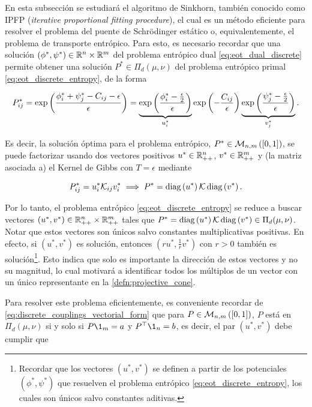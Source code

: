 En esta subsección se estudiará el algoritmo de Sinkhorn, también conocido como IPFP (\textit{iterative proportional fitting procedure}), el cual es un método eficiente para resolver el problema del puente de Schrödinger estático o, equivalentemente, el problema de transporte entrópico. Para esto, es necesario recordar que una solución $(\phi^*,\psi^*)\in\mathbb{R}^n\times\mathbb{R}^m$ del problema entrópico dual \eqref{eq:eot_dual_discrete} permite obtener una solución $P^*\in\Pi_d(\mu,\nu)$ del problema entrópico primal \eqref{eq:eot_discrete_entropy}, de la forma

\begin{equation}
	\label{eq:sinkhorn_decomposition}
	P_{ij}^* = \exp\left(\frac{\phi_i^* + \psi_j^* - C_{ij} - \epsilon}{\epsilon}\right)
	= \underbrace{\exp\left(\frac{\phi^*_i-\frac{\epsilon}{2}}{\epsilon}\right)}_{u^*_i}
	\exp\left(-\frac{C_{ij}}{\epsilon}\right)
	\underbrace{\exp\left(\frac{\psi^*_j-\frac{\epsilon}{2}}{\epsilon}\right)}_{v^*_j}.
\end{equation}

Es decir, la solución óptima para el problema entrópico, $P^*\in\mathcal{M}_{n,m}\left([0,1]\right)$, se puede factorizar usando dos vectores positivos $u^*\in\mathbb{R}^n_{++}$, $v^*\in\mathbb{R}^m_{++}$ y (la matriz asociada a) el Kernel de Gibbs con $T=\epsilon$ mediante

\begin{equation*}
	P_{ij}^* = u^*_i \mathcal{K}_{ij} v^*_i \implies P^* = \operatorname{diag}\left(u^*\right)\mathcal{K}\operatorname{diag}\left(v^*\right).
\end{equation*}

Por lo tanto, el problema entrópico \eqref{eq:eot_discrete_entropy} se reduce a buscar vectores $(u^*,v^*)\in\mathbb{R}^n_{++}\times\mathbb{R}^m_{++}$ tales que $P^* = \operatorname{diag}\left(u^*\right)\mathcal{K}\operatorname{diag}\left(v^*\right)\in\Pi_d(\mu,\nu)$. Notar que estos vectores son únicos salvo constantes multiplicativas positivas. En efecto, si $(u^*,v^*)$ es solución, entonces $(ru^*, \frac{1}{r}v^*)$ con $r>0$ también es solución\footnote{Recordar que los vectores $(u^*,v^*)$ se definen a partir de los potenciales $(\phi^*,\psi^*)$ que resuelven el problema entrópico \eqref{eq:eot_discrete_entropy}, los cuales son únicos salvo constantes aditivas.}. Esto indica que solo es importante la dirección de estos vectores y no su magnitud, lo cual motivará a identificar todos los múltiplos de un vector con un único representante en la \autoref{defn:projective_cone}.

Para resolver este problema eficientemente, es conveniente recordar de \eqref{eq:discrete_couplings_vectorial_form} que para $P\in\mathcal{M}_{n,m}\left([0,1]\right)$, $P$ está en $\Pi_d(\mu,\nu)$ si y solo si $P\1_m = a$ y $P^\top \1_n = b$, es decir, el par $(u^*,v^*)$ debe cumplir que

